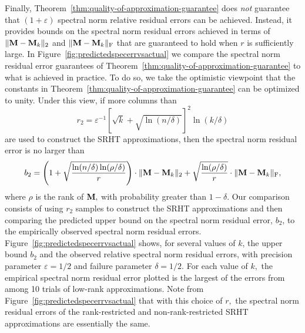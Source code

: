 Finally, Theorem~\ref{thm:quality-of-approximation-guarantee} does \emph{not} guarantee that $(1+\varepsilon)$ spectral norm relative residual errors can be achieved. Instead, it provides bounds on the spectral norm residual errors achieved in terms of $\mbox{}\|{\bm{\mathrm{M}}} - {\bm{\mathrm{M}}}_k\|_2$ and $\mbox{}\|{\bm{\mathrm{M}}} - {\bm{\mathrm{M}}}_k\|_\mathrm{F}$ that are guaranteed to hold when $r$ is sufficiently large. In Figure~\ref{fig:predictedspecerrvsactual} we compare the spectral norm residual error guarantees of Theorem~\ref{thm:quality-of-approximation-guarantee} to what is achieved in practice. To do so, we take the optimistic viewpoint that the constants in Theorem~\ref{thm:quality-of-approximation-guarantee} can be optimized to unity. Under this view, if more columns than
$$r_2 = \varepsilon^{-1} [\sqrt{k} + \sqrt{\ln(n/\delta)}]^2 \ln(k/\delta)$$ are used to construct the SRHT approximations, then the spectral norm residual error is no larger than
\[
 b_2 = \left(1 + \sqrt{{\ln(n/\delta) \ln(\rho/\delta)\over r}}\right) \cdot \mbox{}\|{\bm{\mathrm{M}}} - {\bm{\mathrm{M}}}_k\|_2 + \sqrt{{\ln(\rho/\delta)\over r}} \cdot \mbox{}\|{\bm{\mathrm{M}}} - {\bm{\mathrm{M}}}_k\|_\mathrm{F},
\]
where $\rho$ is the rank of ${\bm{\mathrm{M}}},$ with probability greater than $1-\delta.$ Our comparison consists of using $r_2$ samples to construct the SRHT approximations and then comparing the predicted upper bound on the spectral norm residual error, $b_2$, to the empirically observed spectral norm residual errors. Figure~\ref{fig:predictedspecerrvsactual} shows, for several values of $k$, the upper bound $b_2$ and the observed relative spectral norm residual errors, with precision parameter $\varepsilon = 1/2$ and failure parameter $\delta = 1/2.$ For each value of $k,$ the empirical spectral norm residual error plotted is the largest of the errors from among 10 trials of low-rank approximations. Note from Figure~\ref{fig:predictedspecerrvsactual} that with this choice of $r,$ the spectral norm residual errors of the rank-restricted and non-rank-restricted SRHT approximations are essentially the same.

